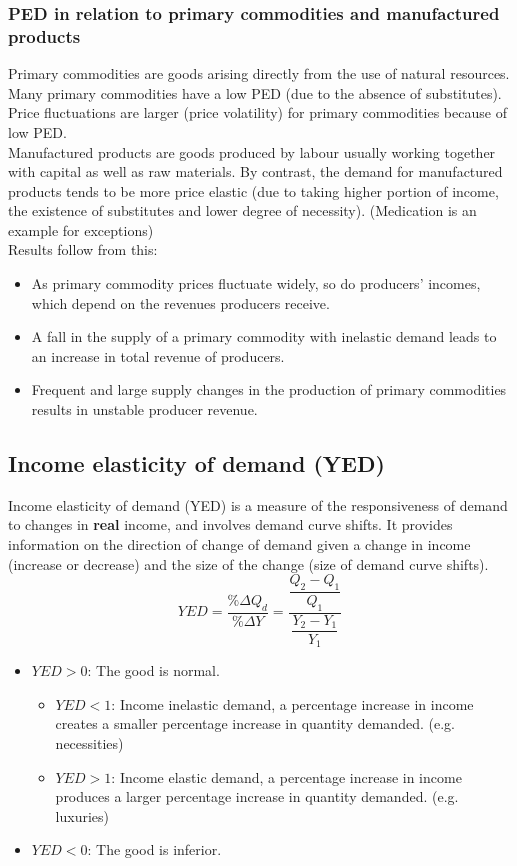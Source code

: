 \subsubsection*{PED in relation to primary commodities and manufactured products}
Primary commodities are goods arising directly from the use of natural resources. Many primary commodities have a low PED (due to the absence of substitutes). Price fluctuations are larger (price volatility) for primary commodities because of low PED.\\
Manufactured products are goods produced by labour usually working together with capital as well as raw materials. By contrast, the demand for manufactured products tends to be more price elastic (due to taking higher portion of income, the existence of substitutes and lower degree of necessity). (Medication is an example for exceptions)\\
Results follow from this:
\begin{itemize}
  \item As primary commodity prices fluctuate widely, so do producers' incomes, which depend on the revenues producers receive.
  \item A fall in the supply of a primary commodity with inelastic demand leads to an increase in total revenue of producers.
  \item Frequent and large supply changes in the production of primary commodities results in unstable producer revenue.
\end{itemize}
\subsection{Income elasticity of demand (YED)}
Income elasticity of demand (YED) is a measure of the responsiveness of demand to changes
in \textbf{real} income, and involves demand curve shifts. It provides information on the direction of change of demand given a change in income (increase or decrease) and the size of the change (size of demand curve shifts).
\[YED=\dfrac{\%\Delta Q_d}{\%\Delta Y}=\dfrac{\dfrac{Q_2-Q_1}{Q_1}}{\dfrac{Y_2-Y_1}{Y_1}}\]
\begin{itemize}
  \item $YED>0$: The good is normal.
  \begin{itemize}
    \item $YED<1$: Income inelastic demand, a percentage increase in income creates a smaller percentage increase in quantity demanded. (e.g. necessities)
    \item $YED>1$: Income elastic demand, a percentage increase in income produces a larger percentage increase in quantity demanded. (e.g. luxuries)
  \end{itemize}
  \item $YED<0$: The good is inferior.
\end{itemize}
